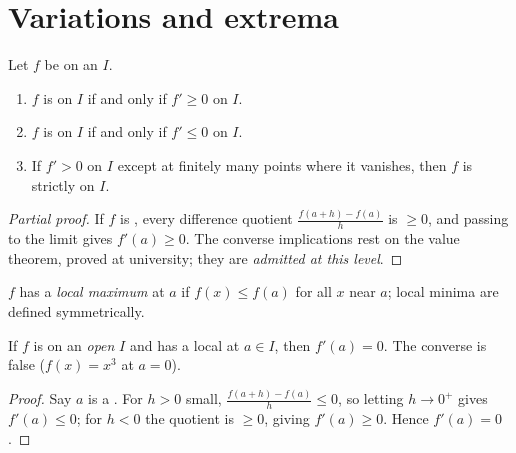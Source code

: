 \section{Variations and extrema}

\begin{theorem}\label{thm:g12:deriv:variations}
Let $f$ be  on an  $I$.
\begin{enumerate}
  \item $f$ is  on $I$ if and only if $f' \geq 0$ on $I$.
  \item $f$ is  on $I$ if and only if $f' \leq 0$ on $I$.
  \item If $f' > 0$ on $I$ except at finitely many points where it
        vanishes, then $f$ is strictly  on $I$.
\end{enumerate}
\end{theorem}

\begin{proof}[Partial proof]
If $f$ is , every difference quotient
$\frac{f(a+h)-f(a)}{h}$ is $\geq 0$, and passing to the limit gives
$f'(a) \geq 0$. The converse implications rest on the  value theorem,
proved at university; they are \emph{admitted at this level}.
\end{proof}

\begin{definition}\label{def:g12:deriv:extremum}
$f$ has a \emph{local maximum} at $a$ if $f(x) \leq f(a)$ for
all $x$ near $a$; local minima are defined symmetrically.
\end{definition}

\begin{proposition}\label{prop:g12:deriv:critical}
If $f$ is  on an \emph{open}  $I$ and has a local
 at $a \in I$, then $f'(a) = 0$. The converse is false
($f(x) = x^3$ at $a = 0$).
\end{proposition}

\begin{proof}
Say $a$ is a . For $h > 0$ small,
$\frac{f(a+h)-f(a)}{h} \leq 0$, so letting $h \to 0^+$ gives $f'(a) \leq 0$;
for $h < 0$ the quotient is $\geq 0$, giving $f'(a) \geq 0$. Hence
$f'(a) = 0$.
\end{proof}

